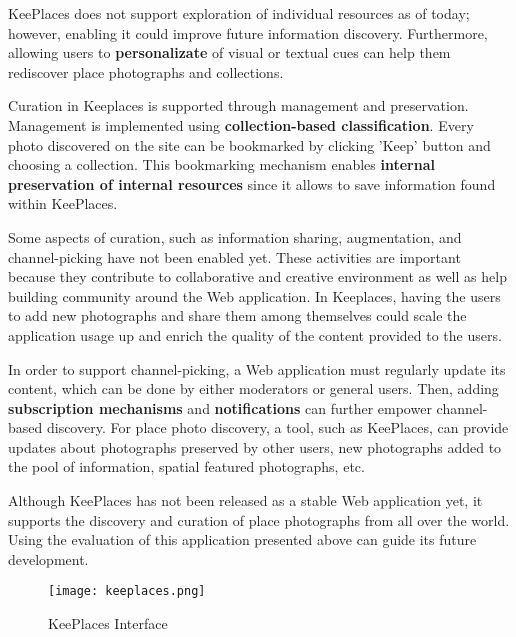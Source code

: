 {KeePlaces does not support exploration of individual resources as of today; however, enabling it could improve future information discovery. Furthermore, allowing users to \textbf{personalizate} of visual or textual cues can help them rediscover place photographs and collections. 

Curation in Keeplaces is supported through management and preservation. Management is implemented using \textbf{collection-based classification}.
Every photo discovered on the site can be bookmarked by clicking 'Keep' button and choosing a collection. This bookmarking mechanism enables \textbf{internal preservation of internal resources} since it allows to save information found within KeePlaces. 

Some aspects of curation, such as information sharing, augmentation, and channel-picking have not been enabled yet. These activities are important because they contribute to collaborative and creative environment as well as help building community around the Web application. In Keeplaces, having the users to add new photographs and share them among themselves could scale the application usage up and enrich the quality of the content provided to the users. 

In order to support channel-picking, a Web application must regularly update its content, which can be done by either moderators or general users. Then, adding \textbf{subscription mechanisms} and \textbf{notifications} can further empower channel-based discovery.  For place photo discovery, a tool, such as KeePlaces, can provide updates about photographs preserved by other users, new photographs added to the pool of information, spatial featured photographs, etc.

Although KeePlaces has not been released as a stable Web application yet, it supports the discovery and curation of place photographs from all over the world. Using the evaluation of this application presented above can guide its future development.

\begin{figure}[ht!]
	\noindent
	\centering
	\texttt{[image: keeplaces.png]}
	\caption{KeePlaces Interface}
	\label{fig:keeplaces} 
\end{figure}

} %

